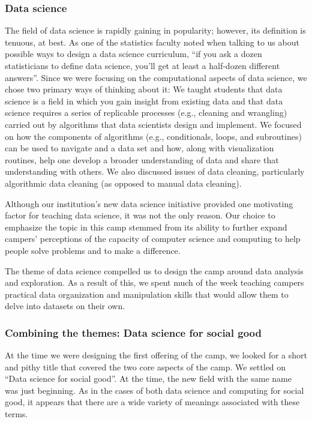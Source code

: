 \subsubsection{Data science}

The field of data science is rapidly gaining in popularity; however,
its definition is tenuous, at best.  As one of the statistics faculty
noted when talking to us about possible ways to design a data science
curriculum, ``if you ask a dozen statisticians to define data
science, you'll get at least a half-dozen different answers''.
Since we were focusing on the computational aspects of data science,
we chose two primary ways of thinking about it: We taught students
that data science is a field in which you gain insight from existing
data and that data science requires a series of replicable processes
(e.g., cleaning and wrangling) carried out by algorithms that data
scientists design and implement.  We focused on how the components
of algorithms (e.g., conditionals,  loops, and subroutines) can be
used to navigate and a data set and how, along with visualization
routines, help one develop a broader understanding of data and share
that understanding with others.  We also discussed issues of data
cleaning, particularly algorithmic data cleaning (as opposed to
manual data cleaning).

Although our institution's new data science initiative provided one
motivating factor for teaching data science, it was not the only
reason.  Our choice to emphasize the topic in this camp stemmed
from its ability to further expand campers' perceptions of the
capacity of computer science and computing to help people solve problems
and to make a difference.

The theme of data science compelled us to design the camp around
data analysis and exploration. As a result of this, we spent much
of the week teaching campers practical data organization and
manipulation skills that would allow them to delve into datasets
on their own.

\subsubsection{Combining the themes: Data science for social good}

At the time we were designing the first offering of the camp, we looked
for a short and pithy title that covered the two core aspects of the camp.
We settled on ``Data science for social good''.  At the time, the
new field with the same name was just beginning.  As in the cases of
both data science and computing for social good, it appears that there
are a wide variety of meanings associated with these terms.

